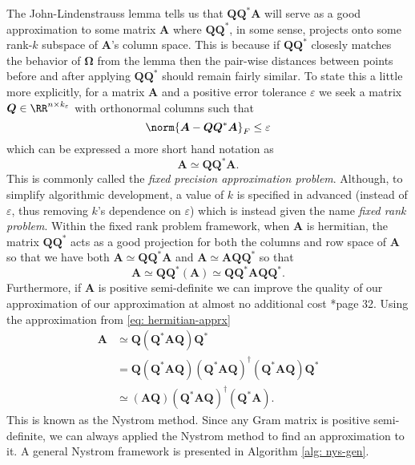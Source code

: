 The John-Lindenstrauss lemma tells us that $\bm{Q} \bm{Q}^{\ast} \bm{A}$ will serve as a good approximation to some matrix $\bm{A}$ where $\bm{Q} \bm{Q}^{\ast}$, in some sense, projects onto some rank-$k$ subspace of $\bm{A}$'s column space. This is because if $\bm{Q} \bm{Q}^{\ast}$ closesly matches the behavior of $\bm{\Omega}$ from the lemma then the pair-wise distances between points before and after applying $\bm{Q} \bm{Q}^{\ast}$ should remain fairly similar. To state this a little more explicitly, for a matrix $\bm{A}$ and a positive error tolerance $\varepsilon$ we seek a matrix $\bm{Q} \in \RR^{n \times k_{\varepsilon}}$ with orthonormal columns such that
\begin{equation*}
    \norm{\bm{A} - \bm{Q} \bm{Q}^{\ast} \bm{A}}_{F} \leq \varepsilon
\end{equation*}
which can be expressed a more short hand notation as
\begin{equation} \label{eq: nys-Q-cond}
    \bm{A} \simeq \bm{Q} \bm{Q}^{\ast} \bm{A}.
\end{equation}
This is commonly called the {\it fixed precision approximation problem}. Although, to simplify algorithmic development, a value of $k$ is specified in advanced (instead of $\varepsilon$, thus removing $k$'s dependence on $\varepsilon$) which is instead given the name {\it fixed rank problem}. Within the fixed rank problem framework, when $\bm{A}$ is hermitian, the matrix $\bm{Q} \bm{Q}^{\ast}$ acts as a good projection for both the columns and row space of $\bm{A}$ so that we have both $\bm{A} \simeq \bm{Q} \bm{Q}^{\ast} \bm{A}$ and $\bm{A} \simeq \bm{A} \bm{Q} \bm{Q}^{\ast}$ so that
\begin{equation} \label{eq: hermitian-apprx}
    \bm{A} \simeq \bm{Q} \bm{Q}^{\ast} \left( \bm{A} \right) \simeq \bm{Q} \bm{Q}^{\ast} \bm{A} \bm{Q} \bm{Q}^{\ast}.
\end{equation}
Furthermore, if $\bm{A}$ is positive semi-definite we can improve the quality of our approximation of our approximation at almost no additional cost \cite{halko2011finding}*{page 32}. Using the approximation from \ref{eq: hermitian-apprx}
\begin{align} \label{eq: nys-apprx}
    \bm{A} & \simeq \bm{Q} \left( \bm{Q}^{\ast} \bm{A} \bm{Q} \right) \bm{Q}^{\ast} \nonumber                                                                                            \\
           & = \bm{Q} \left( \bm{Q}^{\ast} \bm{A} \bm{Q} \right) \left( \bm{Q}^{\ast} \bm{A} \bm{Q} \right)^{\dagger} \left( \bm{Q}^{\ast} \bm{A} \bm{Q} \right) \bm{Q}^{\ast} \nonumber \\
           & \simeq \left( \bm{A} \bm{Q} \right) \left( \bm{Q}^{\ast} \bm{A} \bm{Q} \right)^{\dagger} \left( \bm{Q}^{\ast} \bm{A} \right).
\end{align}
This is known as the Nystrom method. Since any Gram matrix is positive semi-definite, we can always applied the Nystrom method to find an approximation to it. A general Nystrom framework is presented in Algorithm \ref{alg: nys-gen}.

